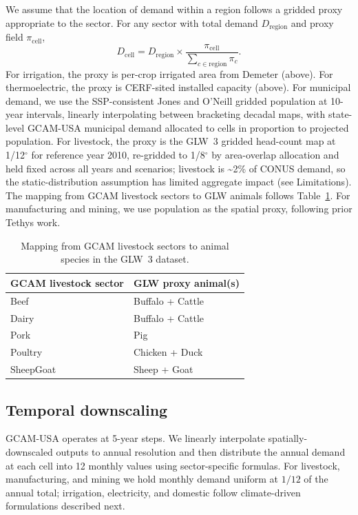 \documentclass[fleqn,10pt]{wlscirep}
\begin{document}
We assume that the location of demand within a region follows a gridded proxy appropriate to the sector. For any sector with total demand $D_{\mathrm{region}}$ and proxy field $\pi_{\mathrm{cell}}$,
\begin{equation}
D_{\mathrm{cell}} = D_{\mathrm{region}} \times \frac{\pi_{\mathrm{cell}}}{\sum_{c \in \mathrm{region}} \pi_{c}}.
\label{eq:spatial}
\end{equation}
For irrigation, the proxy is per-crop irrigated area from Demeter (above). For thermoelectric, the proxy is CERF-sited installed capacity (above). For municipal demand, we use the SSP-consistent Jones and O'Neill\cite{Jones_2016} gridded population at 10-year intervals, linearly interpolating between bracketing decadal maps, with state-level GCAM-USA municipal demand allocated to cells in proportion to projected population. For livestock, the proxy is the GLW~3 gridded head-count map\cite{Gilbert2018} at 1/12$^{\circ}$ for reference year 2010, re-gridded to 1/8$^{\circ}$ by area-overlap allocation and held fixed across all years and scenarios; livestock is \textasciitilde2\% of CONUS demand, so the static-distribution assumption has limited aggregate impact (see Limitations). The mapping from GCAM livestock sectors to GLW animals follows Table~\ref{tab:livestock}. For manufacturing and mining, we use population as the spatial proxy, following prior Tethys work\cite{Khan2023}.

\begin{table}[ht]
\centering
\begin{tabular}{ll}
\toprule
\textbf{GCAM livestock sector} & \textbf{GLW proxy animal(s)} \\
\midrule
Beef      & Buffalo + Cattle \\
Dairy     & Buffalo + Cattle \\
Pork      & Pig \\
Poultry   & Chicken + Duck \\
SheepGoat & Sheep + Goat \\
\bottomrule
\end{tabular}
\caption{Mapping from GCAM livestock sectors to animal species in the GLW~3 dataset.}
\label{tab:livestock}
\end{table}

\subsection*{Temporal downscaling}

GCAM-USA operates at 5-year steps. We linearly interpolate spatially-downscaled outputs to annual resolution and then distribute the annual demand at each cell into 12 monthly values using sector-specific formulas. For livestock, manufacturing, and mining we hold monthly demand uniform at $1/12$ of the annual total; irrigation, electricity, and domestic follow climate-driven formulations described next.
\end{document}
